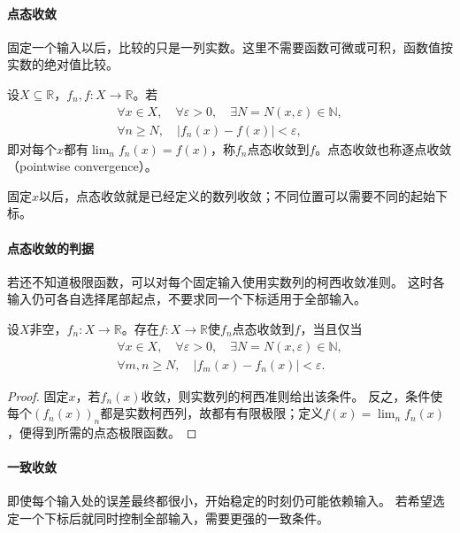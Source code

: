 \paragraph{点态收敛}
固定一个输入以后，比较的只是一列实数。这里不需要函数可微或可积，函数值按实数的绝对值比较。
\begin{definition}[点态收敛]
\label{def:analysis-pointwise-almost-everywhere-convergence}
设$X\subseteq\mathbb R$，$f_n,f:X\to\mathbb{R}$。若
\[
 \begin{gathered}
  \forall x\in X,\quad
  \forall\varepsilon>0,\quad
  \exists N=N(x,\varepsilon)\in\mathbb N,\\
  \forall n\geq N,\quad
  |f_n(x)-f(x)|<\varepsilon,
 \end{gathered}
\]
即对每个$x$都有$\lim_n f_n(x)=f(x)$，称$f_n$点态收敛到$f$。点态收敛也称逐点收敛（pointwise convergence）。
\end{definition}
固定$x$以后，点态收敛就是已经定义的数列收敛；不同位置可以需要不同的起始下标。

\paragraph{点态收敛的判据}
若还不知道极限函数，可以对每个固定输入使用实数列的柯西收敛准则。
这时各输入仍可各自选择尾部起点，不要求同一个下标适用于全部输入。
\begin{theorem}[函数列点态收敛的柯西判据]
\label{thm:analysis-pointwise-cauchy-criterion}
设$X$非空，$f_n:X\to\mathbb R$。存在$f:X\to\mathbb R$使$f_n$点态收敛到$f$，当且仅当
\[
 \begin{gathered}
 \forall x\in X,\quad\forall\varepsilon>0,\quad
 \exists N=N(x,\varepsilon)\in\mathbb N,\\
 \forall m,n\geq N,\quad |f_m(x)-f_n(x)|<\varepsilon.
 \end{gathered}
\]
\end{theorem}
\begin{proof}
固定$x$，若$f_n(x)$收敛，则实数列的柯西准则给出该条件。
反之，条件使每个$(f_n(x))_n$都是实数柯西列，故都有有限极限；定义$f(x)=\lim_nf_n(x)$，便得到所需的点态极限函数。
\end{proof}

\paragraph{一致收敛}
即使每个输入处的误差最终都很小，开始稳定的时刻仍可能依赖输入。
若希望选定一个下标后就同时控制全部输入，需要更强的一致条件。

